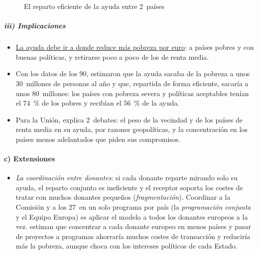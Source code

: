 \documentclass[11pt]{article}
\begin{document}
\begin{figure}[H]
\centering
\caption{El reparto eficiente de la ayuda entre 2~países}\label{fig:reparto}
\end{figure}

\subparagraph{iii) Implicaciones}

\begin{itemize}
\item \uline{La ayuda debe ir a donde reduce más pobreza por euro}: a países pobres y con buenas políticas, y retirarse poco a poco de los de renta media.
\item Con los datos de los 90, \textcite{CollierDollar2002} estimaron que la ayuda sacaba de la pobreza a unos 30~millones de personas al año y que, repartida de forma eficiente, sacaría a unos 80~millones: los países con pobreza severa y políticas aceptables tenían el 74~\% de los pobres y recibían el 56~\% de la ayuda.
\item Para la Unión, explica 2~debates: el peso de la vecindad y de los países de renta media en su ayuda, por razones geopolíticas, y la concentración en los países menos adelantados que piden sus compromisos.
\end{itemize}

\paragraph{c) Extensiones}

\begin{itemize}
\item \emph{La coordinación entre donantes}: si cada donante reparte mirando solo su ayuda, el reparto conjunto es ineficiente y el receptor soporta los costes de tratar con muchos donantes pequeños (\emph{fragmentación}). Coordinar a la Comisión y a los 27~en un solo programa por país (la \emph{programación conjunta} y el Equipo Europa) es aplicar el modelo a todos los donantes europeos a la vez\nocite{KnackRahman2007}. \textcite{BigstenTengstam2015} estiman que concentrar a cada donante europeo en menos países y pasar de proyectos a programas ahorraría muchos costes de transacción y reduciría más la pobreza, aunque choca con los intereses políticos de cada Estado.
\end{itemize}
\end{document}
